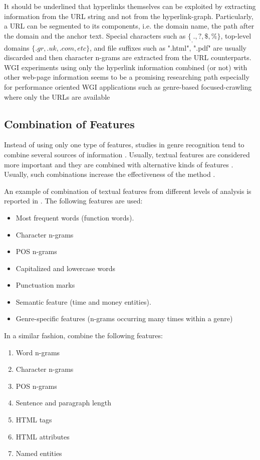It should be underlined that hyperlinks themselves can be exploited by extracting information from the URL string and not from the hyperlink-graph. Particularly, a URL can be segmented to its components, i.e. the domain name, the path after the domain and the anchor text. Special characters such as $\{_ , . , ?, \$ , \%\}$, top-level domains $\{.gr , .uk , .com, etc\}$, and file suffixes such as ".html", ".pdf" are usually discarded and then character n-grams are extracted from the URL counterparts. WGI experiments using only the hyperlink information combined (or not) with other web-page information seems to be a promising researching path especially for performance oriented WGI applications such as genre-based focused-crawling where only the URLs are available \parencite{jebari2014pureURL,jebari2015combination,abramson2012_URL,priyatam2013don_URL} 

\subsection{Combination of Features}

Instead of using only one type of features, studies in genre recognition tend to combine several sources of information . Usually, textual features are considered more important and they are combined with alternative kinds of features . Usually, such combinations increase the effectiveness of the method .

An example of combination of textual features from different levels of analysis is reported in \parencite{onan2018ensemble}. The following features are used:

\begin{itemize}
\item Most frequent words (function words). 
\item Character n-grams
\item POS n-grams
\item Capitalized and lowercase words
\item Punctuation marks 
\item Semantic feature (time and money entities).
\item Genre-specific features (n-grams occurring many times within a genre)
\end{itemize}

In a similar fashion, \parencite{waltinger2010feature} combine the following features:

\begin{enumerate}
\item Word n-grams
\item Character n-grams
\item POS n-grams
\item Sentence and paragraph length
\item HTML tags
\item HTML attributes
\item Named entities
\end{enumerate}

